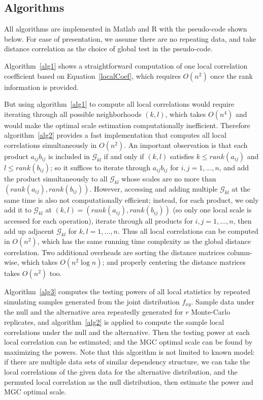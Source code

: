 \documentclass[11pt]{article}
\newcommand{\G}{\mathcal{G}}
\begin{document}
\subsection{Algorithms}
\label{appen:algorithms}
All algorithms are implemented in Matlab and R with the pseudo-code shown below. For ease of presentation, we assume there are no repeating data, and take distance correlation as the choice of global test in the pseudo-code.

Algorithm~\ref{alg1} shows a straightforward computation of one local correlation coefficient based on Equation~\ref{localCoef}, which requires $O(n^2)$ once the rank information is provided.

But using algorithm~\ref{alg1} to compute all local correlations would require iterating through all possible neighborhoods $(k,l)$, which takes $O(n^4)$ and would make the optimal scale estimation computationally inefficient. Therefore algorithm~\ref{alg2} provides a fast implementation that computes all local correlations simultaneously in $O(n^2)$. An important observation is that each product $a_{ij}b_{ij}$ is included in $\G_{kl}$ if and only if $(k,l)$ satisfies $k\leq rank(a_{ij})$ and $l\leq rank(b_{ij})$; so it suffices to iterate through $a_{ij}b_{ij}$ for $i,j=1,\ldots,n$, and add the product simultaneously to all $\G_{kl}$ whose scales are no more than $(rank(a_{ij}),rank(b_{ij}))$. However, accessing and adding multiple $\G_{kl}$ at the same time is also not computationally efficient; instead, for each product, we only add it to $\G_{kl}$ at $(k,l)=(rank(a_{ij}),rank(b_{ij}))$ (so only one local scale is accessed for each operation), iterate through all products for $i,j=1,\ldots,n$, then add up adjacent $\G_{kl}$ for $k,l=1,\ldots,n$. Thus all local correlations can be computed in $O(n^2)$, which has the same running time complexity as the global distance correlation. Two additional overheads are sorting the distance matrices column-wise, which takes $O(n^2 \log n)$; and properly centering the distance matrices takes $O(n^2)$ too. 

Algorithm~\ref{alg3} computes the testing powers of all local statistics by repeated simulating samples generated from the joint distribution $f_{xy}$. Sample data under the null and the alternative area repeatedly generated for $r$ Monte-Carlo replicates, and algorithm~\ref{alg2} is applied to compute the sample local correlations under the null and the alternative. Then the testing power at each local correlation can be estimated; and the MGC optimal scale can be found by maximizing the powers. Note that this algorithm is not limited to known model: if there are multiple data sets of similar dependency structure, we can take the local correlations of the given data for the alternative distribution, and the permuted local correlation as the null distribution, then estimate the power and MGC optimal scale.
\end{document}
